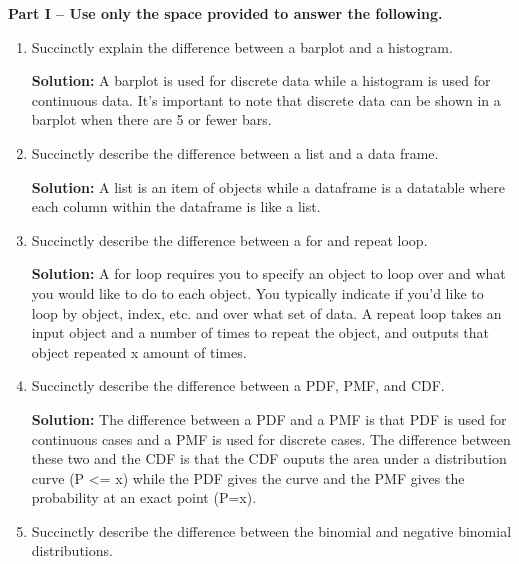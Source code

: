 \documentclass{article}
\begin{document}
\newpage
\textbf{Part I -- Use only the space provided to answer the following.}\\
\begin{enumerate}
  \item Succinctly explain the difference between a barplot and a histogram.\\
    \begin{minipage}[t][1.15in][t]{\textwidth}
    \textbf{Solution:} A barplot is used for discrete data while a histogram is used for continuous data. It's important to note that discrete data can be shown in a barplot when there are 5 or fewer bars.
    \end{minipage}
  \item Succinctly describe the difference between a list and a data frame.\\
    \begin{minipage}[t][1.15in][t]{\textwidth}
    \textbf{Solution:} A list is an item of objects while a dataframe is a datatable where each column within the dataframe is like a list.
    \end{minipage}
  \item Succinctly describe the difference between a for and repeat loop.\\
    \begin{minipage}[t][1.15in][t]{\textwidth}
    \textbf{Solution:} A for loop requires you to specify an object to loop over and what you would like to do to each object.  You typically indicate if you'd like to loop by object, index, etc. and over what set of data. A repeat loop takes an input object and a number of times to repeat the object, and outputs that object repeated x amount of times.
    \end{minipage}
  \item Succinctly describe the difference between a PDF, PMF, and CDF.\\
    \begin{minipage}[t][1.15in][t]{\textwidth}
    \textbf{Solution:} The difference between a PDF and a PMF is that PDF is used for continuous cases and a PMF is used for discrete cases. The difference between these two and the CDF is that the CDF ouputs the area under a distribution curve (P <= x) while the PDF gives the curve and the PMF gives the probability at an exact point (P=x).
    \end{minipage}
  \item Succinctly describe the difference between the binomial and negative 
  binomial distributions.\\

\end{enumerate}
\end{document}
